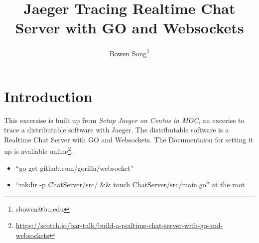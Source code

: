 \documentclass[10pt,twocolumn,letterpaper]{article}
\begin{document}
\title{Jaeger Tracing Realtime Chat Server with GO and Websockets}
\author{Bowen Song\thanks{sbowen@bu.edu}}
\maketitle

\tableofcontents

\clearpage

\section{Introduction}
This excersise is built up from \textit{Setup Jaeger on Centos in MOC}, an excerise to trace a distributable software with Jaeger. The distributable software is a Realtime Chat Server with GO and Websockets. The Documentaion for setting it up is avaliable online\footnote{\url{https://scotch.io/bar-talk/build-a-realtime-chat-server-with-go-and-websockets}}.

\begin{itemize}
	\item ``go get github.com/gorilla/websocket''
	\item ``mkdir -p ChatServer/src/ \&\& touch ChatServer/src/main.go'' at the root


\end{itemize}
\end{document}
